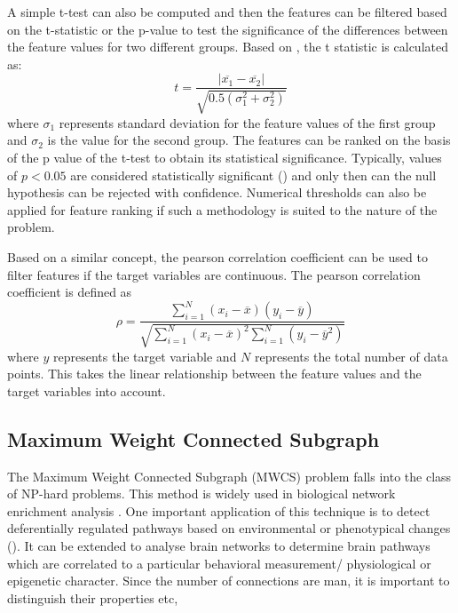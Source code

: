 \documentclass[msthesis.tex]{subfiles}
\begin{document}
A simple t-test can also be computed and then the features can be filtered based on the t-statistic or the p-value to test the significance of the differences between the feature values for two different groups. Based on \cite{inza2004filter}, the t statistic is calculated as:
\begin{equation}
    t = \frac{|\overline{x_1} - \overline{x_2}|}{\sqrt{0.5(\sigma_{1}^2 + \sigma_{2}^2)}}
\end{equation}
where $\sigma_{1}$ represents standard deviation for the feature values of the first group and $\sigma_{2}$ is the value for the second group. 
The features can be ranked on the basis of the p value of the t-test to obtain its statistical significance. Typically, values of $p<0.05$ are considered statistically significant (\cite{colquhoun2017reproducibility}) and only then can the null hypothesis can be rejected with confidence. Numerical thresholds can also be applied for feature ranking if  such a methodology is suited to the nature of the problem. 

Based on a similar concept, the pearson correlation coefficient can be used to filter features if the target variables are continuous. The pearson correlation coefficient is defined as 
\begin{equation}
    \rho = \frac{\sum_{i=1}^{N} (x_{i} - \overline{x}) (y_{i} - \overline{y})}
    {\sqrt{\sum_{i=1}^{N} (x_{i}-\overline{x})^2 \sum_{i=1}^{N} (y_{i}-\overline{y}^2)}}
\end{equation}
where $y$ represents the target variable and $N$ represents the total number of data points. This takes the linear relationship between the feature values and the target variables into account.


\subsection{Maximum Weight Connected Subgraph}
\label{sec:MEWS}
The Maximum Weight Connected Subgraph (MWCS) problem falls into the class of NP-hard problems. This method is widely used in biological network enrichment analysis \cite{DBLP:journals/corr/LobodaAS16}. One important application of this technique is to detect deferentially regulated pathways based on environmental or phenotypical changes (\cite{althaus2014algorithms}). It can be extended to analyse brain networks to determine brain pathways which are correlated to a particular behavioral measurement/ physiological or epigenetic character. Since the number of connections are man, it is important to distinguish their properties etc, 
\end{document}
